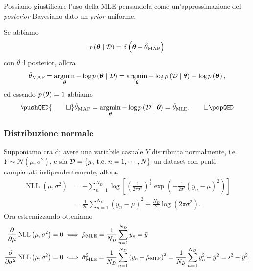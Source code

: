 \documentclass[10pt]{article}
\DeclareMathOperator{\NLL}{NLL}
\newcommand{\HALF}{\frac{1}{2}}
\newcommand{\pare}[1]{
	\ensuremath{\left(#1\right)}
}
\newcommand{\spare}[1]{
	\ensuremath{\left[#1\right]}
}
\newcommand{\MLE}{\ensuremath{\text{MLE}}}
\begin{document}
Possiamo giustificare l'uso della MLE pensandola come un'approssimazione del \textit{posterior} Bayesiano dato un \textit{prior} uniforme.

\begin{example}
Se abbiamo
\[
p\pare{\ve{\theta}\cond\mathcal{D}} = \delta\pare{\ve{\theta}- \hat{\theta}_{\text{MAP}}}
\]
con $\hat{\theta}$ il posterior, allora
\[
\hat{\theta}_{\text{MAP}} = \argmin_{\ve{\theta}}-\log p\pare{\ve{\theta}\cond\mathcal{D}} = \argmin_{\ve{\theta}} -\log p\pare{\mathcal{D}\cond\ve{\theta}} -\log p\pare{\ve{\theta}},
\]
ed essendo $p\pare{\ve{\theta}} = 1$ abbiamo
\[
\pushQED{\qed}
\hat{\theta}_{\text{MAP}} = \argmin_{\ve{\theta}} -\log p\pare{\mathcal{D}\cond\ve{\theta}} = \hat{\theta}_{\text{MLE}}.\qedhere
\popQED
\]
\end{example}

\subsubsection{Distribuzione normale}
Supponiamo ora di avere una variabile casuale $Y$ distribuita normalmente, i.e.
$Y\sim \mathcal{N}\pare{\mu, \sigma^2}$, e sia $\mathcal{D} = \left\{ y_n \;\text{t.c.}\;
n=1,\cdots,N \right\}$ un dataset con punti campionati indipendentemente,
allora:
\begin{equation}
\begin{split}
\NLL\pare{\mu, \sigma^2} &= -\sum_{n=1}^{N_D}\log\spare{\pare{\frac{1}{2\pi\sigma^2}}^\HALF \exp\pare{-\frac{1}{2\sigma^2}\pare{y_n-\mu}^2}} \\
&=\frac{1}{2\sigma}\sum_{n=1}^{N_D}\pare{y_n - \mu}^2 + \frac{N_D}{2}\log\pare{2\pi\sigma^2}.
\end{split}
\end{equation}
Ora estremizzando otteniamo
\begin{align}
\pderiv{}{\mu}\NLL\pare{\mu, \sigma^2} = 0 &\;\Longleftrightarrow\; \hat{\mu}_{\MLE} = \frac{1}{N_D}\sum_{n=1}^{N_D} y_n = \bar{y}\\
\pderiv{}{\sigma^2}\NLL\pare{\mu, \sigma^2} = 0 &\;\Longleftrightarrow\; \hat{\sigma}^2_\MLE = \frac{1}{N_D}\sum_{n=1}^{N_D}\pare{y_n - \hat{\mu}_\MLE}^2 = \frac{1}{N_D}\sum_{n=1}^{N_D}y_n^2 - \bar{y}^2 = s^2 - \bar{y}^2.
\end{align}
\end{document}

